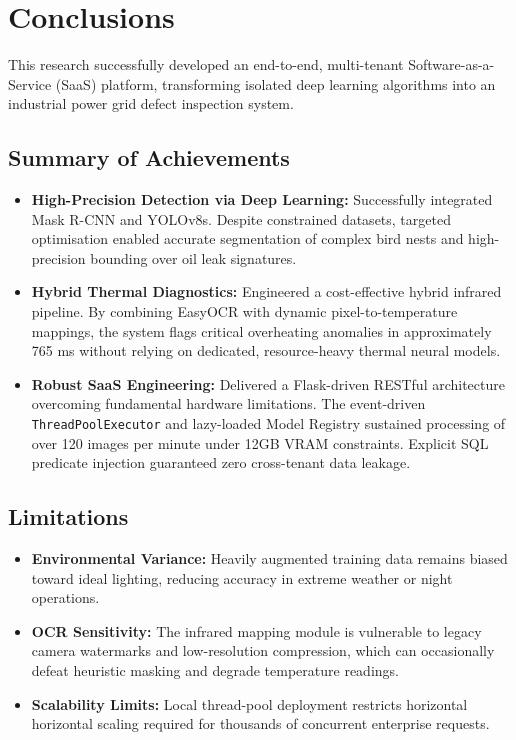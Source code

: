 \documentclass[12pt,a4paper]{article}
\begin{document}
\section{Conclusions}

This research successfully developed an end-to-end, multi-tenant Software-as-a-Service (SaaS) platform, transforming isolated deep learning algorithms into an industrial power grid defect inspection system.

\subsection{Summary of Achievements}
\begin{itemize}
    \item \textbf{High-Precision Detection via Deep Learning:} Successfully integrated Mask R-CNN and YOLOv8s. Despite constrained datasets, targeted optimisation enabled accurate segmentation of complex bird nests and high-precision bounding over oil leak signatures.
    \item \textbf{Hybrid Thermal Diagnostics:} Engineered a cost-effective hybrid infrared pipeline. By combining EasyOCR with dynamic pixel-to-temperature mappings, the system flags critical overheating anomalies in approximately 765 ms without relying on dedicated, resource-heavy thermal neural models.
    \item \textbf{Robust SaaS Engineering:} Delivered a Flask-driven RESTful architecture overcoming fundamental hardware limitations. The event-driven \texttt{ThreadPoolExecutor} and lazy-loaded Model Registry sustained processing of over 120 images per minute under 12GB VRAM constraints. Explicit SQL predicate injection guaranteed zero cross-tenant data leakage.
\end{itemize}

\subsection{Limitations}
\begin{itemize}
    \item \textbf{Environmental Variance:} Heavily augmented training data remains biased toward ideal lighting, reducing accuracy in extreme weather or night operations.
    \item \textbf{OCR Sensitivity:} The infrared mapping module is vulnerable to legacy camera watermarks and low-resolution compression, which can occasionally defeat heuristic masking and degrade temperature readings.
    \item \textbf{Scalability Limits:} Local thread-pool deployment restricts horizontal horizontal scaling required for thousands of concurrent enterprise requests.
\end{itemize}
\end{document}
